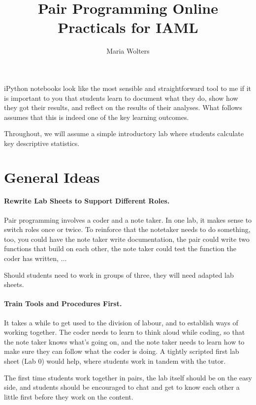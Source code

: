 \documentclass[11pt,a4paper]{article}
\begin{document}
\title{Pair Programming Online Practicals for IAML}

\author{Maria Wolters}

\maketitle

iPython notebooks look like the most sensible and straightforward tool to me if it is important to you that students learn to document what they do, show how they got their results, and reflect on the results of their analyses. What follows assumes that this is indeed one of the key learning outcomes. 

Throughout, we will assume a simple introductory lab where students calculate key descriptive statistics. 

\section{General Ideas}

\paragraph{Rewrite Lab Sheets to Support Different Roles.} Pair programming involves a coder and a note taker.  In one lab, it makes sense to switch roles once or twice. To reinforce that the notetaker needs to do something, too, you could have the note taker write documentation, the pair could write two functions that build on each other, the note taker could test the function the coder has written, $\ldots$

Should students need to work in groups of three, they will need adapted lab sheets. 

\paragraph{Train Tools and Procedures First.} It takes a while to get used to the division of labour, and to establish ways of working together. The coder needs to learn to think aloud while coding, so that the note taker knows what's going on, and the note taker needs to learn how to make sure they can follow what the coder is doing. A tightly scripted first lab sheet (Lab 0) would help, where students work in tandem with the tutor. 

The first time students work together in pairs, the lab itself should be on the easy side, and students should be encouraged to chat and get to know each other a little first before they work on the content.
\end{document}
